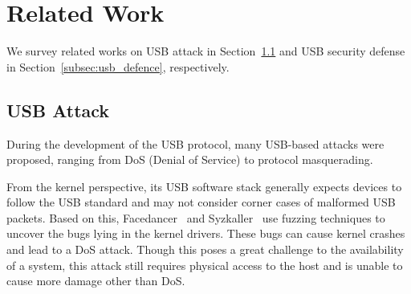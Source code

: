 \section{Related Work}
\label{sec:related_work}

We survey related works on USB attack in Section~\ref{subsec:usb_attack} and
USB security defense in Section~\ref{subsec:usb_defence}, respectively.

\subsection{USB Attack}
\label{subsec:usb_attack}

During the development of the USB protocol, many USB-based attacks were proposed,
ranging from DoS (Denial of Service) to protocol masquerading.

From the kernel perspective, its USB software stack generally expects devices
to follow the USB standard and may not consider corner cases of malformed USB
packets. Based on this, Facedancer~\cite{facedancer} and
Syzkaller~\cite{syzkaller} use fuzzing techniques to uncover the bugs lying in
the kernel drivers. These bugs can cause kernel crashes and lead to a DoS attack.
Though this poses a great challenge to the availability of a system, this
attack still requires physical access to the host and is unable to cause more
damage other than DoS.

